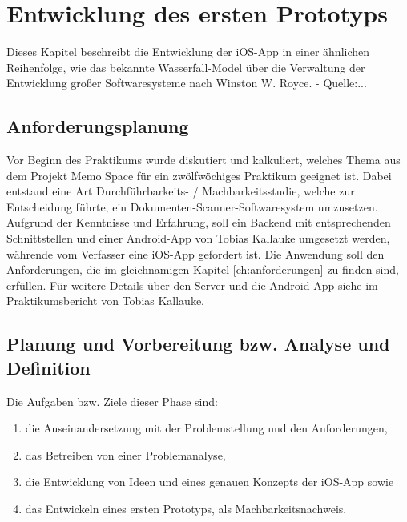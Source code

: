 \documentclass[nomenclature, oneside, 150]{HSMW-Thesis}
\begin{document}

\chapter{Entwicklung des ersten Prototyps}\label{ch:prototyp}
	Dieses Kapitel beschreibt die Entwicklung der iOS-App in einer ähnlichen Reihenfolge, wie das bekannte Wasserfall-Model über die Verwaltung der Entwicklung großer Softwaresysteme nach Winston W. Royce. - Quelle:...
	
	\section{Anforderungsplanung}\label{sc:anforderungsplanung}
	Vor Beginn des Praktikums wurde diskutiert und kalkuliert, welches Thema aus dem Projekt Memo Space für ein zwölfwöchiges Praktikum geeignet ist. Dabei entstand eine Art Durchführbarkeits- / Machbarkeitsstudie, welche zur Entscheidung führte, ein Dokumenten-Scanner-Softwaresystem umzusetzen. Aufgrund der Kenntnisse und Erfahrung, soll ein Backend mit entsprechenden Schnittstellen und einer Android-App von Tobias Kallauke umgesetzt werden, währende vom Verfasser eine iOS-App gefordert ist. Die Anwendung soll den Anforderungen, die im gleichnamigen Kapitel \ref{ch:anforderungen} zu finden sind, erfüllen. Für weitere Details über den Server und die Android-App siehe im Praktikumsbericht von Tobias Kallauke.

	\section{Planung und Vorbereitung bzw. Analyse und Definition}
		Die Aufgaben bzw. Ziele dieser Phase sind:
		\begin{enumerate}
			\item die Auseinandersetzung mit der Problemstellung und den Anforderungen,
			\item das Betreiben von einer Problemanalyse,
			\item die Entwicklung von Ideen und eines genauen Konzepts der iOS-App sowie 
			\item das Entwickeln eines ersten Prototyps, als Machbarkeitsnachweis.
		\end{enumerate}
		
\end{document}
